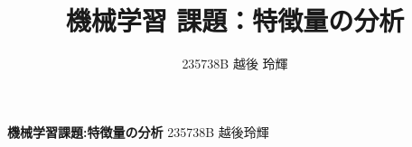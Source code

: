 \documentclass[a4paper,11pt,titlepage]{jsarticle}
\title{機械学習 課題：特徴量の分析}
\author{235738B 越後 玲輝}
\begin{document}
\textbf{機械学習課題:特徴量の分析} \qquad \qquad\qquad\qquad \qquad\qquad\qquad\qquad235738B 越後玲輝
\end{document}
